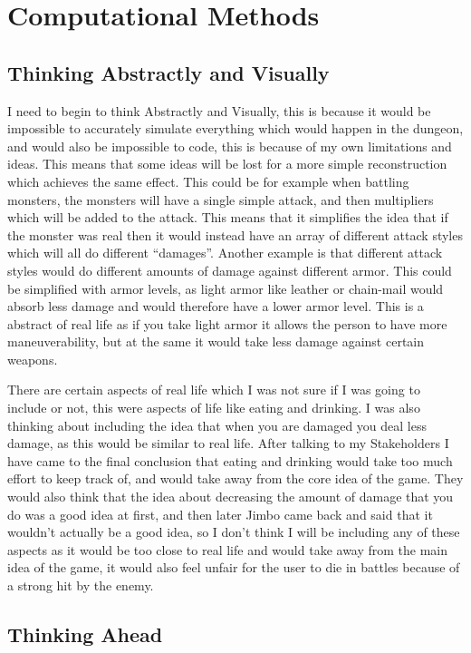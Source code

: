 \documentclass[12pt]{article}
\begin{document}
	\section{Computational Methods}

		\subsection{Thinking Abstractly and Visually}
I need to begin to think Abstractly and Visually, this is because it would be impossible to accurately simulate everything which would happen in the dungeon, and would also be impossible to code, this is because of my own limitations and ideas. This means that some ideas will be lost for a more simple reconstruction which achieves the same effect. This could be for example when battling monsters, the monsters will have a single simple attack, and then multipliers which will be added to the attack. This means that it simplifies the idea that if the monster was real then it would instead have an array of different attack styles which will all do different “damages”. Another example is that different attack styles would do different amounts of damage against different armor. This could be simplified with armor levels, as light armor like leather or chain-mail would absorb less damage and would therefore have a lower armor level. This is a abstract of real life as if you take light armor it allows the person to have more maneuverability, but at the same it would take less damage against certain weapons. 

There are certain aspects of real life which I was not sure if I was going to include or not, this were aspects of life like eating and drinking. I was also thinking about including the idea that when you are damaged you deal less damage, as this would be similar to real life. After talking to my Stakeholders I have came to the final conclusion that eating and drinking would take too much effort to keep track of, and would take away from the core idea of the game. They would also think that the idea about decreasing the amount of damage that you do was a good idea at first, and then later Jimbo came back and said that it wouldn't actually be a good idea, so I don't think I will be including any of these aspects as it would be too close to real life and would take away from the main idea of the game, it would also feel unfair for the user to die in battles because of a strong hit by the enemy. 

	
		\subsection{Thinking Ahead}
	
\end{document}
